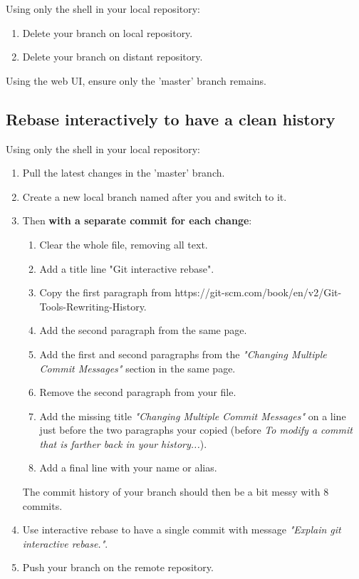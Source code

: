 Using only the shell in your local repository:
\begin{enumerate}
    \item Delete your branch on local repository.
    \item Delete your branch on distant repository.
\end{enumerate}

Using the web UI, ensure only the 'master' branch remains.

\subsection{Rebase interactively to have a clean history}  %

Using only the shell in your local repository:
\begin{enumerate}
    \item Pull the latest changes in the 'master' branch.
    \item Create a new local branch named after you and switch to it.
    \item Then \textbf{with a separate commit for each change}:
        \begin{enumerate}
            \item Clear the whole file, removing all text.
            \item Add a title line "Git interactive rebase".
            \item Copy the first paragraph from https://git-scm.com/book/en/v2/Git-Tools-Rewriting-History.
            \item Add the second paragraph from the same page.
            \item Add the first and second paragraphs from the \textit{"Changing Multiple Commit Messages"} section in the same page.
            \item Remove the second paragraph from your file.
            \item Add the missing title \textit{"Changing Multiple Commit Messages"} on a line just before the two paragraphs your copied (before \textit{To modify a commit that is farther back in your history...}).
            \item Add a final line with your name or alias.
        \end{enumerate}
        The commit history of your branch should then be a bit messy with 8 commits.
    \item Use interactive rebase to have a single commit with message \textit{"Explain git interactive rebase."}.
    \item Push your branch on the remote repository.
\end{enumerate}

